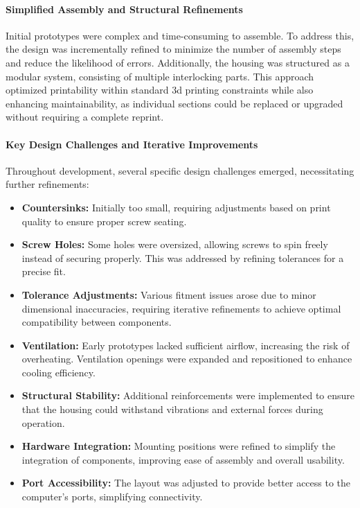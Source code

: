 \paragraph{Simplified Assembly and Structural Refinements}  
Initial prototypes were complex and time-consuming to assemble. To address this, the design was incrementally refined to minimize the number of assembly steps and reduce the likelihood of errors. Additionally, the housing was structured as a modular system, consisting of multiple interlocking parts. This approach optimized printability within standard \acrshort{3d} printing constraints while also enhancing maintainability, as individual sections could be replaced or upgraded without requiring a complete reprint.  

\paragraph{Key Design Challenges and Iterative Improvements}  
Throughout development, several specific design challenges emerged, necessitating further refinements:  
\begin{itemize}  
	\item \textbf{Countersinks:} Initially too small, requiring adjustments based on print quality to ensure proper screw seating.  
	\item \textbf{Screw Holes:} Some holes were oversized, allowing screws to spin freely instead of securing properly. This was addressed by refining tolerances for a precise fit.  
	\item \textbf{Tolerance Adjustments:} Various fitment issues arose due to minor dimensional inaccuracies, requiring iterative refinements to achieve optimal compatibility between components.  
	\item \textbf{Ventilation:} Early prototypes lacked sufficient airflow, increasing the risk of overheating. Ventilation openings were expanded and repositioned to enhance cooling efficiency.  
	\item \textbf{Structural Stability:} Additional reinforcements were implemented to ensure that the housing could withstand vibrations and external forces during operation.  
	\item \textbf{Hardware Integration:} Mounting positions were refined to simplify the integration of components, improving ease of assembly and overall usability.  
	\item \textbf{Port Accessibility:} The layout was adjusted to provide better access to the computer’s ports, simplifying connectivity.  
\end{itemize}  

